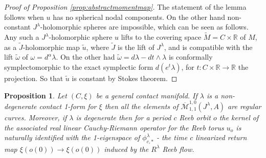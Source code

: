 \documentclass{amsart}
\numberwithin{equation}{section}
\newtheorem{proposition}[equation]{Proposition}
\theoremstyle{definition}
\theoremstyle{remark}
\begin{document}
\begin{proof}[Proof of Proposition \ref{prop:abstractmomentmap}]
The statement of the lemma
follows when $u$ has no spherical nodal components.   On the
other hand non-constant $J ^{\lambda} $-holomorphic spheres are impossible, which can be seen as follows. Any such a $J ^{\lambda} $-holomorphic sphere $u$ lifts to the covering space $\widetilde{M} = C \times \mathbb{R}$ of $M$, as a $\widetilde{J} $-holomorphic map $\widetilde{u} $, where $\widetilde{J} $ is the lift of $J ^{\lambda} $, and is compatible with the lift $\widetilde{\omega}$ of $\omega = d ^{\alpha} \lambda $. On the other had $\widetilde{\omega} = d\lambda - dt \wedge \lambda $ is conformally symplectomorphic to the exact symplectic form 
$d (e ^{t} \lambda)$, for $t: C \times \mathbb{R} \to \mathbb{R}$ the projection.  So that $\widetilde{u} $ is constant by Stokes theorem.

\end{proof}
\begin{proposition} \label{prop:regular} Let $(C, \xi)$ be a general
    contact manifold. If
   $\lambda$ is a non-degenerate contact 1-form for $\xi$
then all the elements of $\overline{\mathcal{M}}_{1,1} ^{1,0}   ( J ^{\lambda} 
, {A} )$ are regular curves. Moreover, if $\lambda$ is degenerate then
for a period $c$ Reeb orbit $o$ the kernel of the associated real linear Cauchy-Riemann operator for the Reeb torus $u _{o} $ is naturally identified with the 1-eigenspace of $\phi _{c,*} ^{\lambda}  $ - 
the time $c$ linearized return map $\xi (o (0)) \to \xi (o (0)) $
induced by the $R^{\lambda}$ Reeb flow.
\end{proposition}
\end{document}
